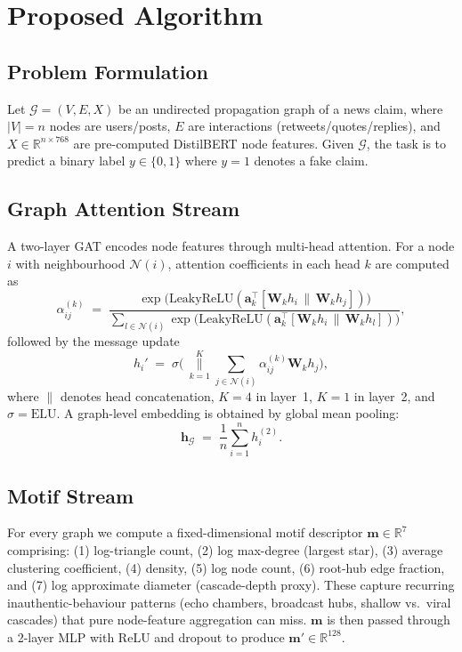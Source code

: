 \documentclass[conference]{IEEEtran}
\begin{document}
\section{Proposed Algorithm}
\label{sec:method}

\subsection{Problem Formulation}
Let $\mathcal{G} = (V, E, X)$ be an undirected propagation graph of a news claim, where $|V|=n$ nodes are users/posts, $E$ are interactions (retweets/quotes/replies), and $X \in \mathbb{R}^{n \times 768}$ are pre-computed DistilBERT node features. Given $\mathcal{G}$, the task is to predict a binary label $y \in \{0, 1\}$ where $y=1$ denotes a fake claim.

\subsection{Graph Attention Stream}
A two-layer GAT \cite{velickovic2018gat} encodes node features through multi-head attention. For a node $i$ with neighbourhood $\mathcal{N}(i)$, attention coefficients in each head $k$ are computed as
\begin{equation}
\alpha_{ij}^{(k)} \;=\; \frac{\exp\!\big(\mathrm{LeakyReLU}(\mathbf{a}_k^\top [\mathbf{W}_k h_i \,\|\, \mathbf{W}_k h_j])\big)}{\sum_{l \in \mathcal{N}(i)} \exp\!\big(\mathrm{LeakyReLU}(\mathbf{a}_k^\top [\mathbf{W}_k h_i \,\|\, \mathbf{W}_k h_l])\big)},
\end{equation}
followed by the message update
\begin{equation}
h_i' \;=\; \sigma\!\Big(\,\operatorname*{\Big\|}_{k=1}^{K} \sum_{j \in \mathcal{N}(i)} \alpha_{ij}^{(k)} \mathbf{W}_k h_j\Big),
\end{equation}
where $\|$ denotes head concatenation, $K{=}4$ in layer~1, $K{=}1$ in layer~2, and $\sigma = \mathrm{ELU}$. A graph-level embedding is obtained by global mean pooling:
\begin{equation}
\mathbf{h}_{\mathcal{G}} \;=\; \frac{1}{n} \sum_{i=1}^{n} h_i^{(2)}.
\end{equation}

\subsection{Motif Stream}
For every graph we compute a fixed-dimensional motif descriptor $\mathbf{m} \in \mathbb{R}^{7}$ comprising:
(1) log-triangle count,
(2) log max-degree (largest star),
(3) average clustering coefficient,
(4) density,
(5) log node count,
(6) root-hub edge fraction, and
(7) log approximate diameter (cascade-depth proxy).
These capture recurring inauthentic-behaviour patterns (echo chambers, broadcast hubs, shallow vs.\ viral cascades) that pure node-feature aggregation can miss. $\mathbf{m}$ is then passed through a 2-layer MLP with ReLU and dropout to produce $\mathbf{m}' \in \mathbb{R}^{128}$.
\end{document}
